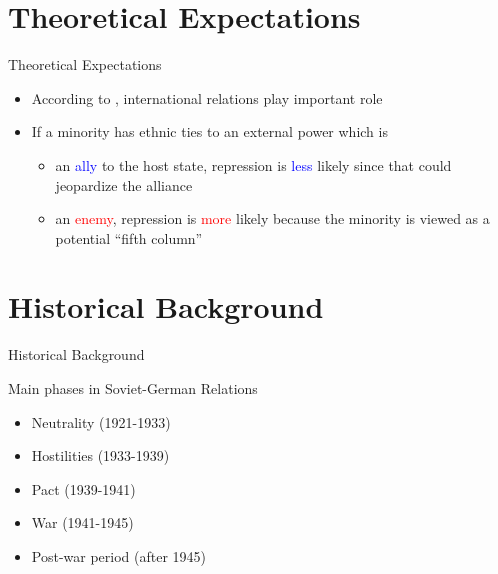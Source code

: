 \documentclass[11pt]{beamer}
\begin{document}
\section{Theoretical Expectations}
\begin{frame}{Theoretical Expectations}
\begin{itemize}
    \item According to \citet{mylonas_politics_2013}, international relations play important role 
    \item If a minority has ethnic ties to an external power
     which is  
    \begin{itemize}
        \item an \textcolor{blue}{ally}  to the host state, repression is \textcolor{blue}{less} likely since that could jeopardize the alliance
        \item an \textcolor{red}{enemy}, repression is \textcolor{red}{more}  likely because the minority is viewed as a potential \enquote{fifth column}

    \end{itemize}
    
\end{itemize}
\end{frame}

\section{Historical Background}
\begin{frame}{Historical Background}
 \begin{block}{Main phases in Soviet-German Relations}
    {
        \begin{itemize}
        \item Neutrality (1921-1933) 
        \item Hostilities (1933-1939)
        \item Pact (1939-1941)
        \item War (1941-1945)
        \item Post-war period (after 1945)
        \end{itemize}
    }
    \end{block}
\end{frame}
\end{document}
